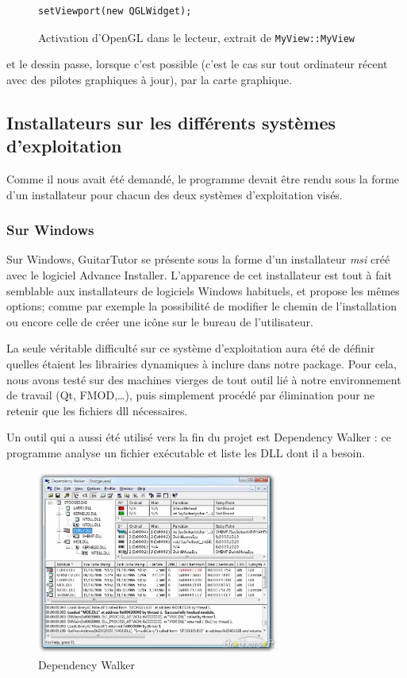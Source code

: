 \begin{figure}[H]
\begin{lstlisting}
setViewport(new QGLWidget);
\end{lstlisting}
\caption{Activation d'OpenGL dans le lecteur, extrait de \texttt{MyView::MyView}}
\label{player_opengl}
\end{figure}

et le dessin passe, lorsque c'est possible (c'est le cas sur tout ordinateur récent avec des pilotes graphiques à jour), par la carte graphique.

\subsection{Installateurs sur les différents systèmes d'exploitation}

Comme il nous avait été demandé, le programme devait être rendu sous la forme d'un installateur pour chacun des deux systèmes d'exploitation visés.

\subsubsection{Sur Windows}

Sur Windows, GuitarTutor se présente sous la forme d'un installateur \textit{msi} créé avec le logiciel Advance Installer. L'apparence de cet installateur est tout à fait semblable aux installateurs de logiciels Windows habituels, et propose les mêmes options; comme par exemple la possibilité de modifier le chemin de l'installation ou encore celle de créer une icône sur le bureau de l'utilisateur.

La seule véritable difficulté sur ce système d'exploitation aura été de définir quelles étaient les librairies dynamiques à inclure dans notre package. Pour cela, nous avons testé sur des machines vierges de tout outil lié à notre environnement de travail (Qt, FMOD,\dots), puis simplement procédé par élimination pour ne retenir que les fichiers dll nécessaires.

Un outil qui a aussi été utilisé vers la fin du projet est Dependency Walker : ce programme analyse un fichier exécutable et liste les
DLL dont il a besoin.

\begin{figure}[H]
\begin{center}
\includegraphics[width=300px]{depwalker.jpeg}
\caption{Dependency Walker}
\label{dep_walker}
\end{center}
\end{figure}


